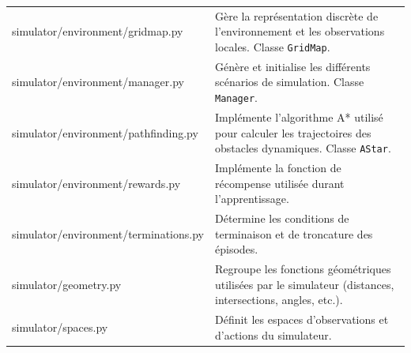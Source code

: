 \begin{longtable}{
        >{\ttfamily\small}p{}
        p{}
    }
    simulator/environment/gridmap.py
                                             & Gère la représentation discrète de l'environnement et les observations locales. Classe \texttt{GridMap}.                                                                                                                                            \\

    simulator/environment/manager.py
                                             & Génère et initialise les différents scénarios de simulation. Classe \texttt{Manager}.                                                                                                                                                               \\

    simulator/environment/pathfinding.py
                                             & Implémente l'algorithme A* utilisé pour calculer les trajectoires des obstacles dynamiques. Classe \texttt{AStar}.                                                                                                                                  \\

    simulator/environment/rewards.py
                                             & Implémente la fonction de récompense utilisée durant l'apprentissage.                                                                                                                                                                               \\

    simulator/environment/terminations.py
                                             & Détermine les conditions de terminaison et de troncature des épisodes.                                                                                                                                                                              \\

    simulator/geometry.py
                                             & Regroupe les fonctions géométriques utilisées par le simulateur (distances, intersections, angles, etc.).                                                                                                                                           \\

    simulator/spaces.py
                                             & Définit les espaces d'observations et d'actions du simulateur.                                                                                                                                                                                      \\


\end{longtable}

